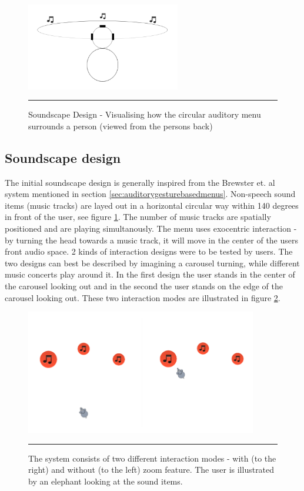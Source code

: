 \begin{figure}[t]
	\centering
		\includegraphics[width=0.6\textwidth,height=\textheight,keepaspectratio]{./Figures/sounddesign.png}
		\rule{35em}{0.5pt}
	\caption[Soundscape Design]{Soundscape Design - Visualising how the circular auditory menu surrounds a person (viewed from the persons back)}
	\label{fig:sounddesign}
\end{figure}

\subsection{Soundscape design}
\label{sec:designsoundscape}
The initial soundscape design is generally inspired from the Brewster et. al system \cite{brewster_multimodaleyes-freeinteraction_2003} mentioned in section \ref{sec:auditorygesturebasedmenus}. Non-speech sound items (music tracks) are layed out in a horizontal circular way within 140 degrees in front of the user, see figure \ref{fig:sounddesign}. The number of music tracks are spatially positioned and are playing simultanously. The menu uses exocentric interaction - by turning the head towards a music track, it will move in the center of the users front audio space. 2 kinds of interaction designs were to be tested by users. The two designs can best be described by imagining a carousel turning, while different music concerts play around it. In the first design the user stands in the center of the carousel looking out and in the second the user stands on the edge of the carousel looking out. These two interaction modes are illustrated in figure \ref{fig:interactionmodes}.

\begin{figure}[t]
	\centering
		\includegraphics[width=0.9\textwidth,height=\textheight,keepaspectratio]{./Figures/interactionmodes.png}
		\rule{35em}{0.5pt}
	\caption[Interaction modes]{The system consists of two different interaction modes - with (to the right) and without (to the left) zoom feature. The user is illustrated by an elephant looking at the sound items.}
	\label{fig:interactionmodes}
\end{figure}

